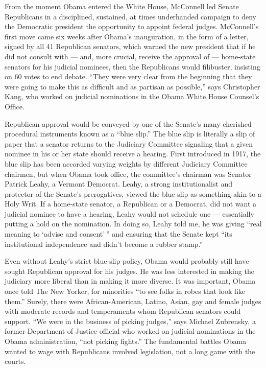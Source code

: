 From the moment Obama entered the White House, McConnell led Senate
Republicans in a disciplined, sustained, at times underhanded campaign
to deny the Democratic president the opportunity to appoint federal
judges. McConnell's first move came six weeks after Obama's
inauguration, in the form of a letter, signed by all 41 Republican
senators, which warned the new president that if he did not consult with
--- and, more crucial, receive the approval of --- home-state senators
for his judicial nominees, then the Republicans would filibuster,
insisting on 60 votes to end debate. ``They were very clear from the
beginning that they were going to make this as difficult and as partisan
as possible,'' says Christopher Kang, who worked on judicial nominations
in the Obama White House Counsel's Office.

Republican approval would be conveyed by one of the Senate's many
cherished procedural instruments known as a ``blue slip.'' The blue slip
is literally a slip of paper that a senator returns to the Judiciary
Committee signaling that a given nominee in his or her state should
receive a hearing. First introduced in 1917, the blue slip has been
accorded varying weights by different Judiciary Committee chairmen, but
when Obama took office, the committee's chairman was Senator Patrick
Leahy, a Vermont Democrat. Leahy, a strong institutionalist and
protector of the Senate's prerogatives, viewed the blue slip as
something akin to a Holy Writ. If a home-state senator, a Republican or
a Democrat, did not want a judicial nominee to have a hearing, Leahy
would not schedule one --- essentially putting a hold on the nomination.
In doing so, Leahy told me, he was giving ``real meaning to `advise and
consent' '' and ensuring that the Senate kept ``its institutional
independence and didn't become a rubber stamp.''

Even without Leahy's strict blue-slip policy, Obama would probably still
have sought Republican approval for his judges. He was less interested
in making the judiciary more liberal than in making it more diverse. It
was important, Obama once told The New Yorker, for minorities ``to see
folks in robes that look like them.'' Surely, there were
African-American, Latino, Asian, gay and female judges with moderate
records and temperaments whom Republican senators could support. ``We
were in the business of picking judges,'' says Michael Zubrensky, a
former Department of Justice official who worked on judicial nominations
in the Obama administration, ``not picking fights.'' The fundamental
battles Obama wanted to wage with Republicans involved legislation, not
a long game with the courts.

